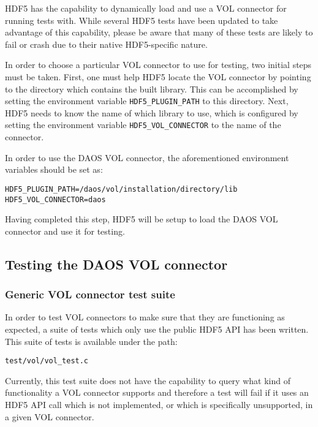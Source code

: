 HDF5 has the capability to dynamically load and use a VOL connector for running tests with. While several HDF5 tests have been updated to take advantage of this capability, please be aware that many of these tests are likely to fail or crash due to their native HDF5-specific nature.

In order to choose a particular VOL connector to use for testing, two initial steps must be taken. First, one must help HDF5 locate the VOL connector by pointing to the directory which contains the built library. This can be accomplished by setting the environment variable \texttt{HDF5\_PLUGIN\_PATH} to this directory. Next, HDF5 needs to know the name of which library to use, which is configured by setting the environment variable \texttt{HDF5\_VOL\_CONNECTOR} to the name of the connector.

In order to use the DAOS VOL connector, the aforementioned environment variables should be set as:

\begin{verbatim}
HDF5_PLUGIN_PATH=/daos/vol/installation/directory/lib
HDF5_VOL_CONNECTOR=daos
\end{verbatim}

Having completed this step, HDF5 will be setup to load the DAOS VOL connector and use it for testing.

\newpage

\subsection{Testing the DAOS VOL connector}

\subsubsection{Generic VOL connector test suite}

In order to test VOL connectors to make sure that they are functioning as expected, a suite of tests which only use the public HDF5 API has been written. This suite of tests is available under the path:

\begin{verbatim}
test/vol/vol_test.c
\end{verbatim}

Currently, this test suite does not have the capability to query what kind of functionality a VOL connector supports and therefore a test will fail if it uses an HDF5 API call which is not implemented, or which is specifically unsupported, in a given VOL connector.

